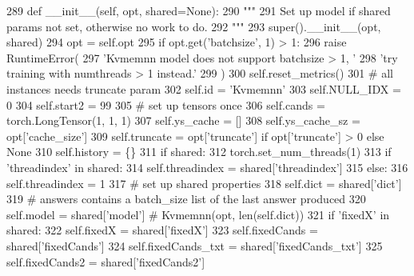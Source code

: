 \begin{DoxyCode}
289     \textcolor{keyword}{def }\_\_init\_\_(self, opt, shared=None):
290         \textcolor{stringliteral}{"""}
291 \textcolor{stringliteral}{        Set up model if shared params not set, otherwise no work to do.}
292 \textcolor{stringliteral}{        """}
293         super().\_\_init\_\_(opt, shared)
294         opt = self.opt
295         \textcolor{keywordflow}{if} opt.get(\textcolor{stringliteral}{'batchsize'}, 1) > 1:
296             \textcolor{keywordflow}{raise} RuntimeError(
297                 \textcolor{stringliteral}{'Kvmemnn model does not support batchsize > 1, '}
298                 \textcolor{stringliteral}{'try training with numthreads > 1 instead.'}
299             )
300         self.reset\_metrics()
301         \textcolor{comment}{# all instances needs truncate param}
302         self.id = \textcolor{stringliteral}{'Kvmemnn'}
303         self.NULL\_IDX = 0
304         self.start2 = 99
305         \textcolor{comment}{# set up tensors once}
306         self.cands = torch.LongTensor(1, 1, 1)
307         self.ys\_cache = []
308         self.ys\_cache\_sz = opt[\textcolor{stringliteral}{'cache\_size'}]
309         self.truncate = opt[\textcolor{stringliteral}{'truncate'}] \textcolor{keywordflow}{if} opt[\textcolor{stringliteral}{'truncate'}] > 0 \textcolor{keywordflow}{else} \textcolor{keywordtype}{None}
310         self.history = \{\}
311         \textcolor{keywordflow}{if} shared:
312             torch.set\_num\_threads(1)
313             \textcolor{keywordflow}{if} \textcolor{stringliteral}{'threadindex'} \textcolor{keywordflow}{in} shared:
314                 self.threadindex = shared[\textcolor{stringliteral}{'threadindex'}]
315             \textcolor{keywordflow}{else}:
316                 self.threadindex = 1
317             \textcolor{comment}{# set up shared properties}
318             self.dict = shared[\textcolor{stringliteral}{'dict'}]
319             \textcolor{comment}{# answers contains a batch\_size list of the last answer produced}
320             self.model = shared[\textcolor{stringliteral}{'model'}]  \textcolor{comment}{# Kvmemnn(opt, len(self.dict))}
321             \textcolor{keywordflow}{if} \textcolor{stringliteral}{'fixedX'} \textcolor{keywordflow}{in} shared:
322                 self.fixedX = shared[\textcolor{stringliteral}{'fixedX'}]
323                 self.fixedCands = shared[\textcolor{stringliteral}{'fixedCands'}]
324                 self.fixedCands\_txt = shared[\textcolor{stringliteral}{'fixedCands\_txt'}]
325                 self.fixedCands2 = shared[\textcolor{stringliteral}{'fixedCands2'}]

\end{DoxyCode}
